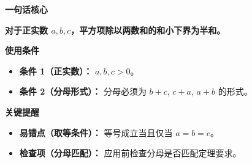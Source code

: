 \begin{summarybox}
\textbf{\textcolor{CSummary}{一句话核心}}

\textbf{对于正实数 $a, b, c$，平方项除以两数和的和小下界为半和。}

\medskip
\textbf{\textcolor{CSummary}{使用条件}}
\begin{itemize}[leftmargin=*, itemsep=0.5em, topsep=0.4em]
    \item \textbf{条件 1（正实数）：} $a, b, c > 0$。
    \item \textbf{条件 2（分母形式）：} 分母必须为 $b+c$, $c+a$, $a+b$ 的形式。
\end{itemize}

\medskip
\textbf{\textcolor{CSummary}{关键提醒}}
\begin{itemize}[leftmargin=*, itemsep=0.5em, topsep=0.4em]
    \item \textbf{易错点（取等条件）：} 等号成立当且仅当 $a=b=c$。
    \item \textbf{检查项（分母匹配）：} 应用前检查分母是否匹配定理要求。
\end{itemize}
\end{summarybox}

